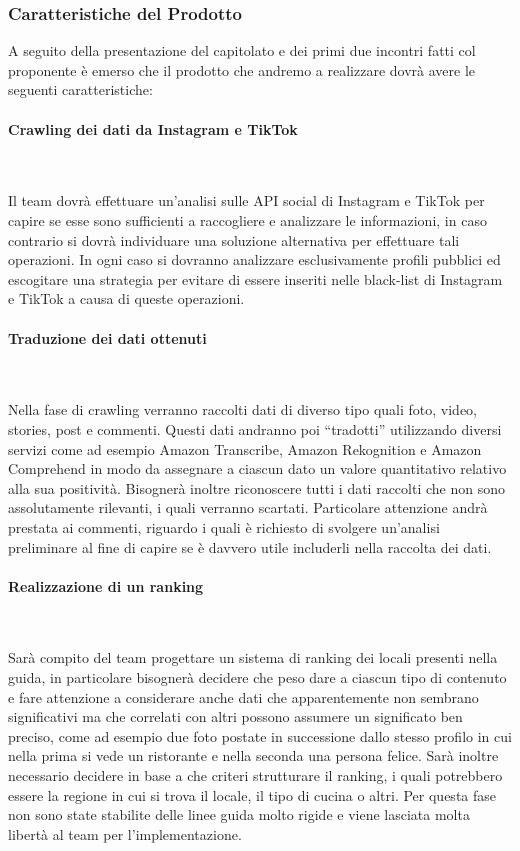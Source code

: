 \documentclass[letterpaper]{article}
\begin{document}
\subsubsection{Caratteristiche del Prodotto}

A seguito della presentazione del capitolato e dei primi due incontri fatti col proponente è emerso che il prodotto che andremo a realizzare dovrà avere le seguenti caratteristiche:

\paragraph{Crawling dei dati da Instagram e TikTok} \ \par\bigskip
Il team dovrà effettuare un’analisi sulle API social di Instagram e TikTok per capire se esse sono sufficienti a raccogliere e analizzare le informazioni, in caso contrario si dovrà individuare una soluzione alternativa per effettuare tali operazioni. In ogni caso si dovranno analizzare esclusivamente profili pubblici ed escogitare una strategia per evitare di essere inseriti nelle black-list di Instagram e TikTok a causa di queste operazioni.

\paragraph{Traduzione dei dati ottenuti} \ \par\bigskip
Nella fase di crawling verranno raccolti dati di diverso tipo quali foto, video, stories, post e commenti. Questi dati andranno poi “tradotti” utilizzando diversi servizi come ad esempio Amazon Transcribe, Amazon Rekognition e Amazon Comprehend in modo da assegnare a ciascun dato un valore quantitativo relativo alla sua positività. Bisognerà inoltre riconoscere tutti i dati raccolti che non sono assolutamente rilevanti, i quali verranno scartati. Particolare attenzione andrà prestata ai commenti, riguardo i quali è richiesto di svolgere un’analisi preliminare al fine di capire se è davvero utile includerli nella raccolta dei dati.

\paragraph{Realizzazione di un ranking} \ \par\bigskip
Sarà compito del team progettare un sistema di ranking dei locali presenti nella guida, in particolare bisognerà decidere che peso dare a ciascun tipo di contenuto e fare attenzione a considerare anche dati che apparentemente non sembrano significativi ma che correlati con altri possono assumere un significato ben preciso, come ad esempio due foto postate in successione dallo stesso profilo in cui nella prima si vede un ristorante e nella seconda una persona felice. Sarà inoltre necessario decidere in base a che criteri strutturare il ranking, i quali potrebbero essere la regione in cui si trova il locale, il tipo di cucina o altri. Per questa fase non sono state stabilite delle linee guida molto rigide e viene lasciata molta libertà al team per l’implementazione.
\end{document}
